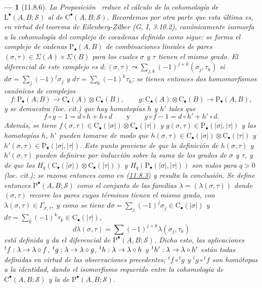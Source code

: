 \documentclass[10pt,oneside,openany]{book}
\theoremstyle{egaenv}\newtheorem*{env}{---}
\theoremstyle{egastatement}
\theoremstyle{egadescription}
\newcommand{\oldpage}[2][]{\marginnote{\normalfont\scriptsize\textbf{#1}\,|\,#2}\ignorespaces}
\renewcommand{\to}{\mathchoice{\longrightarrow}{\rightarrow}{\rightarrow}{\rightarrow}}
\begin{document}
\begin{env}[11.8.6]
\label{0.11.8.6}
\label{0.11.8.6-fr}
\oldpage[0\textsubscript{III}]{45}
La Proposición~ reduce el cálculo de la cohomología de
$\mathrm L^\bullet(A,B;\mathscr S)$ al de
$\mathrm C^\bullet(A,B;\mathscr S)$. Recordemos por otra parte que esta última es, en virtud del teorema de Eilenberg-Zilber (G, I, 3.10.2), canónicamente isomorfa a la cohomología del complejo de cocadenas definido como sigue: se forma el complejo de cadenas $\mathrm P_\bullet(A,B)$ de combinaciones lineales de pares
$(\sigma,\tau)\in\Sigma(A)\times\Sigma(B)$ para los cuales $\sigma$ y
$\tau$ tienen \emph{el mismo grado}.
El diferencial de este complejo es
$d:(\sigma,\tau)\leadsto\sum_{j,k}(-1)^{j+k}(\sigma_j,\tau_k)$ si $d\sigma=\sum_j(-1)^j\sigma_j$ y $d\tau=\sum_k(-1)^k\tau_k$; se tienen entonces dos homomorfismos canónicos de complejos
\[
f:\mathrm P_\bullet(A,B)\longrightarrow
\mathrm C_\bullet(A)\otimes\mathrm C_\bullet(B),\qquad
g:\mathrm C_\bullet(A)\otimes\mathrm C_\bullet(B)
\longrightarrow\mathrm P_\bullet(A,B),
\] y se demuestra (\emph{loc. cit.}) que hay \emph{homotopías} $h$ y $h'$ tales que
\[
f\circ g-1=d\circ h+h\circ d\qquad\text{y}\qquad
g\circ f-1=d\circ h'+h'\circ d.
\]
Además, se tiene $f(\sigma,\tau)\in\mathrm C_\bullet(|\sigma|)
\otimes\mathrm C_\bullet(|\tau|)$ y $g(\sigma,\tau)\in\mathrm P_\bullet(|\sigma|,|\tau|)$ y las homotopías $h$, $h'$ \emph{pueden tomarse de modo que} $h(\sigma,\tau)\in\mathrm C_\bullet(|\sigma|)
\otimes\mathrm C_\bullet(|\tau|)$ \emph{y} $h'(\sigma,\tau)\in\mathrm P_\bullet(|\sigma|,|\tau|)$. Este punto proviene de que la definición de $h(\sigma,\tau)$ y $h'(\sigma,\tau)$ pueden definirse por
\emph{inducción} sobre la suma de los grados de $\sigma$ y $\tau$, y de que los $H_q(\mathrm C_\bullet(|\sigma|)\otimes\mathrm C_\bullet(|\tau|))$ y $H_q(\mathrm P_\bullet(|\sigma|,|\tau|))$ son \emph{nulos} para $q>0$ (\emph{loc. cit.}); se razona entonces como en (\hyperref[0.11.8.3-fr]{11.8.3}) y resulta la conclusión. Se define entonces $\mathrm P^\bullet(A,B;\mathscr S)$ como el conjunto de las familias $\lambda=(\lambda(\sigma,\tau))$ donde $(\sigma,\tau)$ recorre los pares cuyos términos tienen el mismo grado, con $\lambda(\sigma,\tau)\in\Gamma_{\sigma,\tau}$, y como se tiene $d\sigma=\sum_j(-1)^j\sigma_j\in\mathrm C_\bullet(|\sigma|)$ y $d\tau=\sum_k(-1)^k\tau_k\in\mathrm C_\bullet(|\tau|)$,
\[
d\lambda(\sigma,\tau)=
\sum(-1)^{j+k}\lambda(\sigma_j,\tau_k)
\]
está definida y da el diferencial de
$\mathrm P^\bullet(A,B;\mathscr S)$. Dicho esto, las aplicaciones ${}^tf:\lambda\to\lambda\circ f$, ${}^tg:\lambda\to\lambda\circ g$, ${}^th:\lambda\to\lambda\circ h$ y ${}^th':\lambda\to\lambda\circ h'$ están todas \emph{definidas} en virtud de las observaciones precedentes;
${}^tf\circ{}^tg$ y ${}^tg\circ{}^tf$ son homótopas a la
identidad, dando el isomorfismo requerido entre la cohomología de
$\mathrm C^\bullet(A,B;\mathscr S)$ y la de
$\mathrm P^\bullet(A,B;\mathscr S)$.
\end{env}
\end{document}
